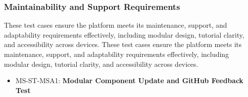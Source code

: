 \documentclass[12pt, titlepage]{article}
\begin{document}
\subsubsection{Maintainability and Support Requirements}

\hspace{2em}These test cases ensure the platform meets its maintenance, support, and adaptability requirements effectively, including modular design, tutorial clarity, and accessibility across devices.
\hspace{2em}These test cases ensure the platform meets its maintenance, support, and adaptability requirements effectively, including modular design, tutorial clarity, and accessibility across devices.

\begin{itemize} 

  \item MS-ST-MSA1: \textbf{Modular Component Update and GitHub Feedback Test}


\end{itemize}
\end{document}
